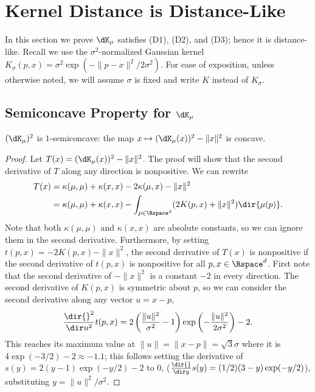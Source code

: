 \documentclass[11pt]{myclass}
\begin{document}
\section{Kernel Distance is Distance-Like} 
\label{sec:prop}

In this section we prove $\dK_\mu$ satisfies (D1), (D2), and (D3); hence it is distance-like.  
Recall we use the $\sigma^2$-normalized Gaussian kernel $K_\sigma(p,x) = \sigma^2 \exp(-\|p - x\|^2 / 2 \sigma^2)$.  For ease of exposition, unless otherwise noted, we will assume $\sigma$ is fixed and write $K$ instead of $K_\sigma$.  




\subsection{Semiconcave Property for $\dK_\mu$}

\begin{lemma}[D2]
$(\dK_\mu)^2$ is $1$-semiconcave: the map $x \mapsto (\dK_\mu(x))^2 - \|x\|^2$ is concave. \label{lem:semi}

\end{lemma}
\begin{proof}
Let $T(x) =  (\dK_\mu(x))^2 - \|x\|^2$.  The proof will show that the second derivative of $T$ along any direction is nonpositive.  
We can rewrite 
\begin{align*}
T(x) 
&= 
\kappa(\mu,\mu) + \kappa(x,x) - 2\kappa(\mu,x) - \|x\|^2 
\\ &= 
\kappa(\mu,\mu) + \kappa(x,x) - \int_{p \in \Rspace^d} (2K(p,x) +\|x\|^2) \dir{\mu(p)}.
\end{align*}
Note that both $\kappa(\mu,\mu)$ and $\kappa(x,x)$ are absolute constants, so we can ignore them in the second derivative.  
Furthermore, by setting $t(p,x) = -2K(p,x) - \|x\|^2$, the second derivative of $T(x)$ is nonpositive if the second derivative of $t(p,x)$ is nonpositive for all $p,x \in \Rspace^d$.  
First note that the second derivative of $-\|x\|^2$ is a constant $-2$ in every direction.  
The second derivative of $K(p,x)$ is symmetric about $p$, so we can consider the second derivative along any vector $u = x-p$,
\[
\frac{\dir{}^2}{\dir u^2} t(p,x) 
= 
2\left(\frac{ \|u\|^2}{\sigma^2} -1\right) \exp\left(-\frac{\| u \|^2}{2\sigma^2}\right) - 2.
\]
This reaches its maximum value at $\| u \| = \|x-p\| = \sqrt{3}\sigma$ where it is $4\exp(-3/2)-2 \approx -1.1$; this follows setting the derivative of $s(y) = 2(y-1) \exp(-y/2)-2$ to $0$, ($\frac{\dir{}}{\dir y} s(y) = (1/2)(3-y)\exp(-y/2)$), substituting $y = \|u\|^2/\sigma^2$.  
\end{proof}
\end{document}
